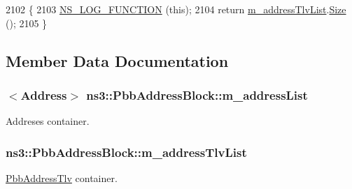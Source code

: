 \begin{DoxyCode}
2102 \{
2103   \hyperlink{log-macros-disabled_8h_a90b90d5bad1f39cb1b64923ea94c0761}{NS\_LOG\_FUNCTION} (\textcolor{keyword}{this});
2104   \textcolor{keywordflow}{return} \hyperlink{classns3_1_1PbbAddressBlock_aee976005ebb4d8ebeaec3e155d4800f1}{m\_addressTlvList}.\hyperlink{classns3_1_1PbbAddressTlvBlock_ac53e76c6db6595b66919404c8fda701f}{Size} ();
2105 \}
\end{DoxyCode}


\subsection{Member Data Documentation}
\subsubsection[{\texorpdfstring{m\+\_\+address\+List}{m_addressList}}]{$<${\bf Address}$>$ ns3\+::\+Pbb\+Address\+Block\+::m\+\_\+address\+List\hspace{0.3cm}{\ttfamily [private]}}\hypertarget{classns3_1_1PbbAddressBlock_a155cb46a9aa55bb6d8b885000685396a}{}\label{classns3_1_1PbbAddressBlock_a155cb46a9aa55bb6d8b885000685396a}


Addreses container. 

\subsubsection[{\texorpdfstring{m\+\_\+address\+Tlv\+List}{m_addressTlvList}}]{ ns3\+::\+Pbb\+Address\+Block\+::m\+\_\+address\+Tlv\+List\hspace{0.3cm}{\ttfamily [private]}}\hypertarget{classns3_1_1PbbAddressBlock_aee976005ebb4d8ebeaec3e155d4800f1}{}\label{classns3_1_1PbbAddressBlock_aee976005ebb4d8ebeaec3e155d4800f1}


\hyperlink{classns3_1_1PbbAddressTlv}{Pbb\+Address\+Tlv} container. 


